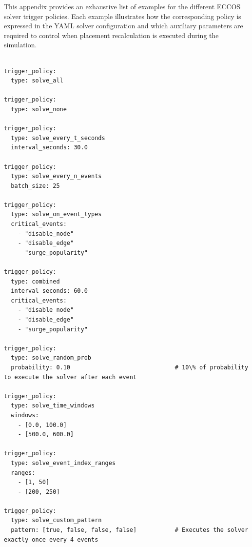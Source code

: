 \documentclass[ASNA]{USG} %
\begin{document}

This appendix provides an exhaustive list of examples for the different \textsc{ECCOS} solver trigger policies. Each example illustrates how the corresponding policy is expressed in the YAML solver configuration and which auxiliary parameters are required to control when placement recalculation is executed during the simulation.

\begin{lstlisting}[caption={YAML configuration examples list for all the solver trigger policy alternatives.},label=lst:yaml_tworegimes, basicstyle=\fontsize{8}{10}\selectfont\ttfamily]

trigger_policy:
  type: solve_all

trigger_policy:
  type: solve_none

trigger_policy:
  type: solve_every_t_seconds
  interval_seconds: 30.0

trigger_policy:
  type: solve_every_n_events
  batch_size: 25

trigger_policy:
  type: solve_on_event_types
  critical_events:
    - "disable_node"
    - "disable_edge"
    - "surge_popularity"

trigger_policy:
  type: combined
  interval_seconds: 60.0
  critical_events:
    - "disable_node"
    - "disable_edge"
    - "surge_popularity"

trigger_policy:
  type: solve_random_prob
  probability: 0.10                              # 10\% of probability to execute the solver after each event

trigger_policy:
  type: solve_time_windows
  windows:
    - [0.0, 100.0]
    - [500.0, 600.0]

trigger_policy:
  type: solve_event_index_ranges
  ranges:
    - [1, 50]
    - [200, 250]

trigger_policy:
  type: solve_custom_pattern
  pattern: [true, false, false, false]           # Executes the solver exactly once every 4 events
\end{lstlisting}
\end{document}
